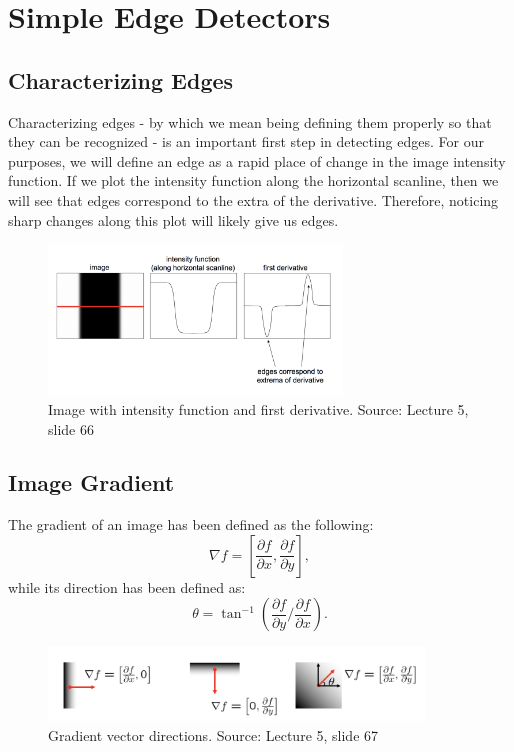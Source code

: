 \documentclass{article}
\begin{document}
\section{Simple Edge Detectors}

\subsection{Characterizing Edges}
Characterizing edges - by which we mean being defining them properly so that they can be recognized - is an important first step in detecting edges. For our purposes, we will define an edge as a rapid place of change in the image intensity function. If we plot the intensity function along the horizontal scanline, then we will see that edges correspond to the extra of the derivative. Therefore, noticing sharp changes along this plot will likely give us edges.

\begin{figure}[H]
\centering
\includegraphics[height=4cm]{lazebnik.png}
\caption{Image with intensity function and first derivative. Source: Lecture 5, slide 66}
\end{figure}

\subsection{Image Gradient}
The gradient of an image has been defined as the following:
$$\nabla f = \left[ \frac{\partial f}{\partial x}, \frac{\partial f}{\partial y}\right],$$
while its direction has been defined as:
$$\theta = \tan^{-1} \left( \frac{\partial f}{\partial y} / \frac{\partial f}{\partial x} \right).$$


\begin{figure}[H]
\centering
\includegraphics[width=10cm]{seitz_gradient_direction.png}
\caption{Gradient vector directions. Source: Lecture 5, slide 67}
\end{figure}
\end{document}
